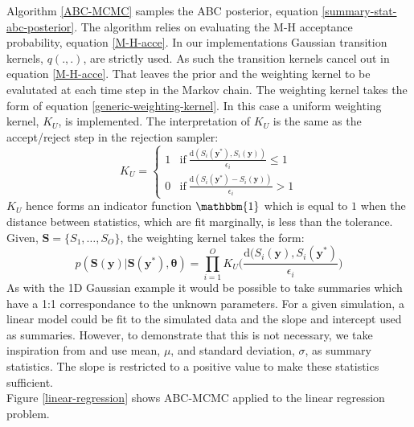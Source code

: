 Algorithm \ref{ABC-MCMC} samples the ABC posterior, equation \ref{summary-stat-abc-posterior}. The algorithm relies on evaluating the M-H acceptance probability, equation \ref{M-H-acce}. In our implementations Gaussian transition kernels, $q(.,.)$, are strictly used. As such the transition kernels cancel out in equation \ref{M-H-acce}. That leaves the prior and the weighting kernel to be evalutated at each time step in the Markov chain. The weighting kernel takes the form of equation \ref{generic-weighting-kernel}. In this case a uniform weighting kernel, $K_U$, is implemented. The interpretation of $K_U$ is the same as the accept/reject step in the rejection sampler: 
\begin{equation}
	K_U = 
	\begin{cases}
		1 & \text{if}\ 	\frac{\text{d}(S_i(\bm{y^*}),S_i(\bm{y}))}				{\epsilon_i} \leq 1\\
		0 & \text{if}\ \frac{\text{d}(S_i(\bm{y^*}) - S_i(\bm{y}))}				{\epsilon_i} > 1
	\end{cases}
\end{equation}
$K_U$ hence forms an indicator function $\mathbbm{1}$ which is equal to $1$ when the distance between statistics, which are fit marginally, is less than the tolerance. Given, $\bm{S} = \{S_1,\dots,S_O\}$, the weighting kernel takes the form:
\begin{equation}
	p(\bm{S}(\bm{y})|\bm{S}(\bm{y^*}),\bm{\theta}) = \prod_{i = 1}^{O} K_U\Big(\frac{\text{d}(S_i(\bm{y}),S_i(\bm{y^*})}{\epsilon_i}\Big)
	\label{weight-kernel}
\end{equation}
\noindent
As with the 1D Gaussian example it would be possible to take summaries which have a 1:1 correspondance to the unknown parameters. For a given simulation, a linear model could be fit to the simulated data and the slope and intercept used as summaries. However, to demonstrate that this is not necessary, we take inspiration from \citet{vrugt2013toward} and use mean, $\mu$, and standard deviation, $\sigma$, as summary statistics. The slope is restricted to a positive value to make these statistics sufficient. \\

Figure \ref{linear-regression} shows ABC-MCMC applied to the linear regression problem. \\

